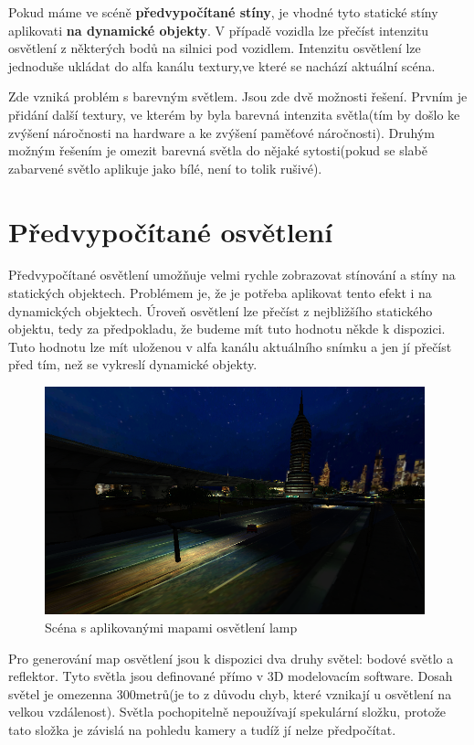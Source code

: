 \documentclass[11pt,twoside,a4paper]{book}
\begin{document}
Pokud máme ve scéně \textbf{předvypočítané stíny}, je vhodné tyto statické stíny aplikovat\linebreak i \textbf{na dynamické objekty}. V případě vozidla lze přečíst intenzitu osvětlení z některých bodů na silnici pod vozidlem. Intenzitu osvětlení lze jednoduše ukládat do alfa kanálu textury,\linebreak ve které se nachází aktuální scéna.

Zde vzniká problém s barevným světlem. Jsou zde dvě možnosti řešení. Prvním je přidání další textury, ve kterém by byla barevná intenzita světla(tím by došlo ke zvýšení náročnosti na hardware a ke zvýšení paměťové náročnosti). Druhým možným řešením je omezit barevná světla do nějaké sytosti(pokud se slabě zabarvené světlo aplikuje jako bílé, není to tolik rušivé).

\section{Předvypočítané osvětlení}

Předvypočítané osvětlení umožňuje velmi rychle zobrazovat stínování a stíny na statických objektech. Problémem je, že je potřeba aplikovat tento efekt i na dynamických objektech. Úroveň osvětlení lze přečíst z nejbližšího statického objektu, tedy za předpokladu, že budeme mít tuto hodnotu někde k dispozici. Tuto hodnotu lze mít uloženou v alfa kanálu aktuálního snímku a jen jí přečíst před tím, než se vykreslí dynamické objekty.

\begin{figure}[h!]
\begin{center}
\includegraphics[width=110mm]{figures/lamps.png}
\caption{Scéna s aplikovanými mapami osvětlení lamp}
\end{center}
\end{figure}

Pro generování map osvětlení jsou k dispozici dva druhy světel: bodové světlo a reflektor. Tyto světla jsou definované přímo v 3D modelovacím software. Dosah světel je omezen\linebreak na 300metrů(je to z důvodu chyb, které vznikají u osvětlení na velkou vzdálenost). Světla pochopitelně nepoužívají spekulární složku, protože tato složka je závislá na pohledu kamery a tudíž jí nelze předpočítat.
\end{document}
